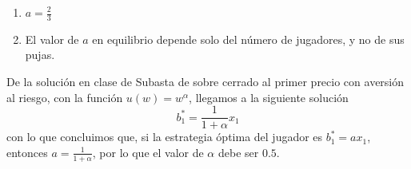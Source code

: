 \documentclass[12pt]{scrartcl} %
\begin{document}
\begin{Exercise}[name={Respuesta}]

  \begin{enumerate}
    \item $ a = \frac{2}{3} $
    \item El valor de $ a $ en equilibrio depende solo del número de jugadores, y no de sus pujas.
  \end{enumerate}

\end{Exercise}

\begin{Exercise}[name={Respuesta}]

De la solución en clase de Subasta de sobre cerrado al primer precio con aversión al riesgo, con la función $ u(w) = w^\alpha $, llegamos a la siguiente solución
    \[b_1^* = \frac{1}{1+\alpha}x_1\]
    con lo que concluimos que, si la estrategia óptima del jugador es $ b_1^* = ax_1$, entonces $ a = \frac{1}{1+\alpha} $, por lo que el valor de $ \alpha $ debe ser $ 0.5 $.

\end{Exercise}
\end{document}
